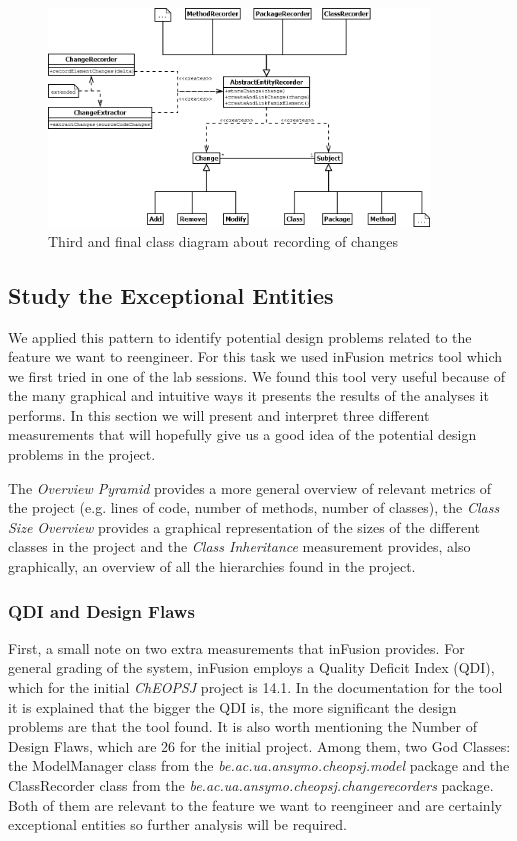 \documentclass[a4paper]{article}
\begin{document}
\begin{figure}[h]
\centering
\includegraphics[width=0.9\textwidth]{Images/spec2}
\caption{Third and final class diagram about recording of changes}
\label{fig:spec2b}
\end{figure}

\subsection{Study the Exceptional Entities}
We applied this pattern to identify potential design problems related to the feature we want to reengineer. For this task we used inFusion metrics tool which we first tried in one of the lab sessions. We found this tool very useful because of the many graphical and intuitive ways it presents the results of the analyses it performs. In this section we will present and interpret three different measurements that will hopefully give us a good idea of the potential design problems in the project. 

The \emph{Overview Pyramid} provides a more general overview of relevant metrics of the project (e.g. lines of code, number of methods, number of classes), the \emph{Class Size Overview} provides a graphical representation of the sizes of the different classes in the project and the \emph{Class Inheritance} measurement provides, also graphically, an overview of all the hierarchies found in the project.

\subsubsection{QDI and Design Flaws}
First, a small note on two extra measurements that inFusion provides. For general grading of the system, inFusion employs a Quality Deficit Index (QDI), which for the initial \emph{ChEOPSJ} project is 14.1. In the documentation for the tool it is explained that the bigger the QDI is, the more significant the design problems are that the tool found. It is also worth mentioning the Number of Design Flaws, which are 26 for the initial project. Among them, two God Classes: the ModelManager class from the \emph{be.ac.ua.ansymo.cheopsj.model} package and the ClassRecorder class from the \emph{be.ac.ua.ansymo.cheopsj.changerecorders} package. Both of them are relevant to the feature we want to reengineer and are certainly exceptional entities so further analysis will be required.
\end{document}
